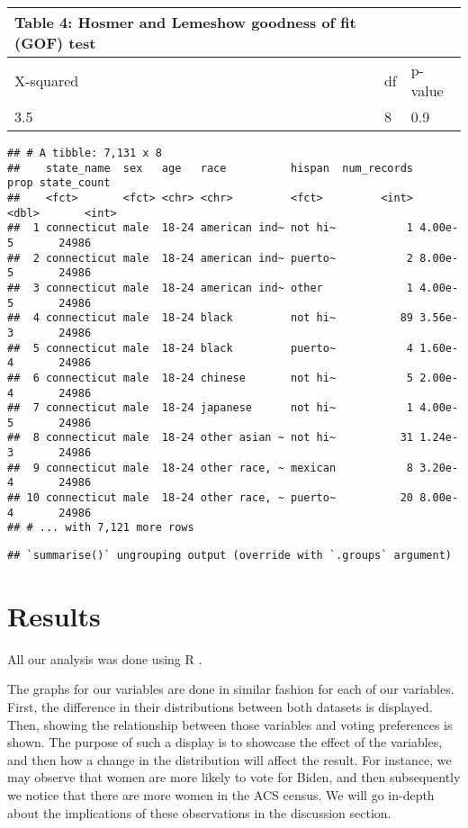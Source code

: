 \documentclass[
]{article}
\begin{document}
\begin{longtable}[]{@{}lll@{}}
\toprule
Table 4: Hosmer and Lemeshow goodness of fit (GOF) test & &\tabularnewline
\midrule
\endhead
X-squared & df & p-value\tabularnewline
3.5 & 8 & 0.9\tabularnewline
\bottomrule
\end{longtable}

\begin{verbatim}
## # A tibble: 7,131 x 8
##    state_name  sex   age   race          hispan  num_records    prop state_count
##    <fct>       <fct> <chr> <chr>         <fct>         <int>   <dbl>       <int>
##  1 connecticut male  18-24 american ind~ not hi~           1 4.00e-5       24986
##  2 connecticut male  18-24 american ind~ puerto~           2 8.00e-5       24986
##  3 connecticut male  18-24 american ind~ other             1 4.00e-5       24986
##  4 connecticut male  18-24 black         not hi~          89 3.56e-3       24986
##  5 connecticut male  18-24 black         puerto~           4 1.60e-4       24986
##  6 connecticut male  18-24 chinese       not hi~           5 2.00e-4       24986
##  7 connecticut male  18-24 japanese      not hi~           1 4.00e-5       24986
##  8 connecticut male  18-24 other asian ~ not hi~          31 1.24e-3       24986
##  9 connecticut male  18-24 other race, ~ mexican           8 3.20e-4       24986
## 10 connecticut male  18-24 other race, ~ puerto~          20 8.00e-4       24986
## # ... with 7,121 more rows
\end{verbatim}

\begin{verbatim}
## `summarise()` ungrouping output (override with `.groups` argument)
\end{verbatim}

\hypertarget{results}{%
\section{Results}\label{results}}

All our analysis was done using R \cite{@CiteR}.

The graphs for our variables are done in similar fashion for each of our variables. First, the difference in their distributions between both datasets is displayed. Then, showing the relationship between those variables and voting preferences is shown. The purpose of such a display is to showcase the effect of the variables, and then how a change in the distribution will affect the result. For instance, we may observe that women are more likely to vote for Biden, and then subsequently we notice that there are more women in the ACS census. We will go in-depth about the implications of these observations in the discussion section.
\end{document}
